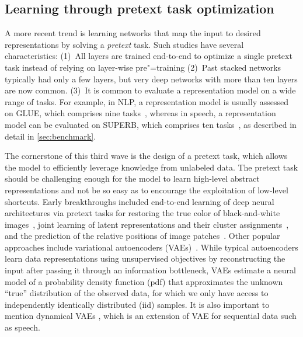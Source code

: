 \subsection{Learning through pretext task optimization}

A more recent trend is learning networks that map the input to desired
representations by solving a \textit{pretext} task. Such studies have several
characteristics:
(1)~All layers are trained end-to-end to optimize a single pretext task instead
of relying on layer-wise pre"=training
(2)~Past stacked networks typically had only a few layers, but 
very deep networks with more than ten layers are now common.
(3)~It is common to evaluate a representation model on a wide range of tasks.
For example, in NLP, a representation model is usually assessed on GLUE,
which comprises nine tasks~\parencite{wang_glue_2018}, whereas in speech, a representation model can be
evaluated on SUPERB, which comprises ten tasks~\parencite{yang_superb_2021}, 
as described in detail in \cref{sec:benchmark}.

The cornerstone of this third wave is the design of a pretext task, which
allows the model to efficiently leverage knowledge from unlabeled data.
The pretext task should be challenging enough for the model to learn high-level
abstract representations and 
  not be so easy as to encourage the exploitation of low-level shortcuts.  %
Early breakthroughs included end-to-end learning of deep neural architectures
via pretext tasks for restoring the true color of black-and-white
images~\parencite{zhang_colorful_2016}, joint learning of latent representations and their
cluster assignments~\parencite{caron_deep_2018}, and the prediction of the relative positions of
image patches~\parencite{doersch_unsupervised_2016}. Other popular approaches include variational
autoencoders (VAEs)~\parencite{kingma_autoencoding_2014, rezende_stochastic_2014}. While typical autoencoders learn data
representations using unsupervised objectives by reconstructing the input
after passing it through an information bottleneck, VAEs estimate a neural model of a probability density function (pdf) that approximates the unknown “true” distribution of the observed data, for which we only have access to independently identically distributed (iid) samples. It is also important to mention dynamical VAEs \parencite{girin_dynamical_2021}, which is an extension of VAE for sequential data such as speech.

